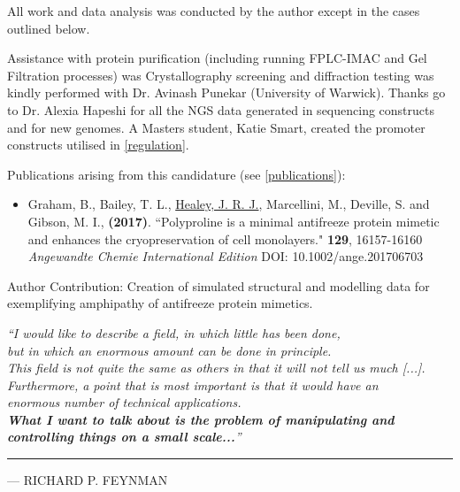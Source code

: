 \documentclass[a4paper, oneside, 11pt]{report} %
\newlength\longest
\begin{document}
All work and data analysis was conducted by the author except in the cases outlined below.

Assistance with protein purification (including running FPLC-IMAC and Gel Filtration processes) was Crystallography screening and diffraction testing was kindly performed with Dr. Avinash Punekar (University of Warwick). Thanks go to Dr. Alexia Hapeshi for all the NGS data generated in sequencing constructs and for new genomes. A Masters student, Katie Smart, created the promoter constructs utilised in \vref{regulation}.

Publications arising from this candidature (see \vref{publications}):

\begin{itemize}
\item Graham, B., Bailey, T. L., \underline{Healey, J. R. J.}, Marcellini, M., Deville, S. and Gibson, M. I., \textbf{(2017)}.
``Polyproline is a minimal antifreeze protein mimetic and enhances the cryopreservation of cell monolayers." \textbf{129}, 16157-16160 \emph{Angewandte Chemie International Edition} DOI: 10.1002/ange.201706703
\end{itemize}
Author Contribution: Creation of simulated structural and modelling data for exemplifying amphipathy of antifreeze protein mimetics.

\newpage

\thispagestyle{empty}
\null\vfill
\settowidth{}
\begin{center}
\parbox{\longest}{%
 \raggedright{\large \itshape%
   ``I would like to describe a field, in which little has been done, \\
   but in which an enormous amount can be done in principle. \\[2ex]
   This field is not quite the same as others in that it will not tell us much [...]. \\
   Furthermore, a point that is most important is that it would have an \\
   enormous number of technical applications.\\[2ex]


   \large \textbf{What I want to talk about is the problem of manipulating and controlling
   things on a small scale...}'' \par\vspace{0.35cm}\hrule\bigskip
   }
   \raggedleft\Large\MakeUppercase{--- Richard P. Feynman}\par%
}
\end{center}
\vfill
\end{document}
